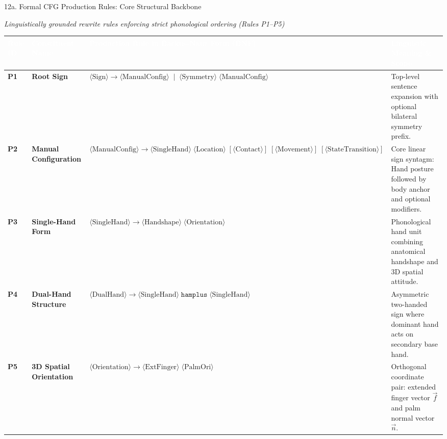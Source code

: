 \documentclass[aspectratio=169]{beamer}
\begin{document}
\begin{frame}[t]{12a. Formal CFG Production Rules: Core Structural Backbone}
\vspace{-0.1cm}
\begin{center}
    \scriptsize\textit{\textcolor{amritaMaroon}{Linguistically grounded rewrite rules enforcing strict phonological ordering (Rules P1--P5)}}
\end{center}

\vspace{-1.5mm}
\centering
\setlength{\tabcolsep}{4pt}
\renewcommand{\arraystretch}{1.28}
{\fontsize{7.2pt}{9.2pt}\selectfont
\begin{tabular}{|>{\centering\arraybackslash\bfseries}p{1.0cm}|>{\raggedright\arraybackslash\bfseries}p{2.6cm}|>{\raggedright\arraybackslash}p{5.8cm}|>{\raggedright\arraybackslash}p{3.2cm}|}
    \hline
    \rowcolor{maroon}
    \textcolor{white}{\textbf{Rule ID}} & 
    \textcolor{white}{\textbf{Constituent Name}} & 
    \textcolor{white}{\textbf{Production Rule in Backus-Naur Form (BNF)}} & 
    \textcolor{white}{\textbf{Linguistic Meaning \& Scope}} \\
    \hline
    \rowcolor{lightblue} 
    \textbf{P1} & Root Sign & 
    $\langle\text{Sign}\rangle \to \langle\text{ManualConfig}\rangle \;\mid\; \langle\text{Symmetry}\rangle \;\langle\text{ManualConfig}\rangle$ & 
    Top-level sentence expansion with optional bilateral symmetry prefix. \\
    \hline
    \rowcolor{lightgreen} 
    \textbf{P2} & Manual Configuration & 
    $\langle\text{ManualConfig}\rangle \to \langle\text{SingleHand}\rangle \;\langle\text{Location}\rangle \;[\langle\text{Contact}\rangle] \;[\langle\text{Movement}\rangle] \;[\langle\text{StateTransition}\rangle]$ & 
    Core linear sign syntagm: Hand posture followed by body anchor and optional modifiers. \\
    \hline
    \rowcolor{lightyellow} 
    \textbf{P3} & Single-Hand Form & 
    $\langle\text{SingleHand}\rangle \to \langle\text{Handshape}\rangle \;\langle\text{Orientation}\rangle$ & 
    Phonological hand unit combining anatomical handshape and 3D spatial attitude. \\
    \hline
    \rowcolor{lightcyan} 
    \textbf{P4} & Dual-Hand Structure & 
    $\langle\text{DualHand}\rangle \to \langle\text{SingleHand}\rangle \;\texttt{hamplus}\; \langle\text{SingleHand}\rangle$ & 
    Asymmetric two-handed sign where dominant hand acts on secondary base hand. \\
    \hline
    \rowcolor{lightorange} 
    \textbf{P5} & 3D Spatial Orientation & 
    $\langle\text{Orientation}\rangle \to \langle\text{ExtFinger}\rangle \;\langle\text{PalmOri}\rangle$ & 
    Orthogonal coordinate pair: extended finger vector $\vec{f}$ and palm normal vector $\vec{n}$. \\
    \hline
\end{tabular}
}


\end{frame}
\end{document}
